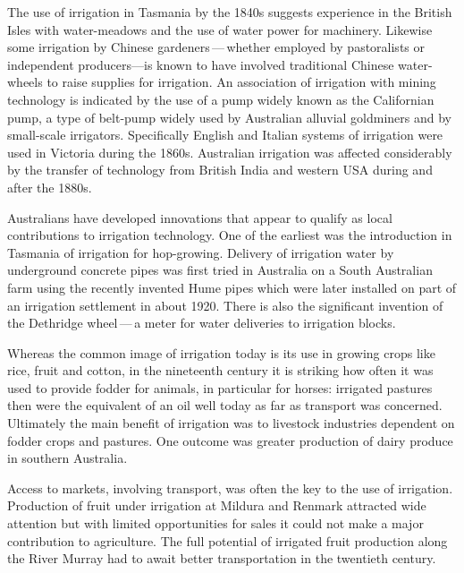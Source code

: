 The use of irrigation in Tasmania by the 1840s suggests experience in
the British Isles with water-meadows and the use of
water power for machinery.  Likewise some irrigation by Chinese
gardeners\,---\,whether employed by pastoralists or independent
producers---is known to have involved traditional
Chinese water-wheels to
raise supplies for irrigation.  An association of irrigation with
mining technology is indicated by the use of a pump widely known as
the Californian pump,  a type of
belt-pump  widely used by Australian
alluvial goldminers and by small-scale irrigators.  Specifically
English and Italian systems of
irrigation were used in Victoria during the 1860s. Australian
irrigation was affected considerably by the transfer of technology
from British India and western USA during and after the
1880s.

Australians have developed innovations that appear to qualify as local
contributions to irrigation technology.  One of the earliest was the
introduction in Tasmania of irrigation for hop-growing.  Delivery of
irrigation water by underground concrete pipes
was first tried in Australia on a South Australian farm using the
recently invented Hume pipes which were later installed on part of an
irrigation settlement in about 1920.  There is also the significant
invention of the Dethridge wheel\,---\,a
 meter for water
deliveries to irrigation blocks.

\bigskip\noindent Whereas the common image of irrigation today is its
use in growing crops like rice, fruit and cotton, in the nineteenth
century it is striking how often it was used to provide fodder for
animals, in particular for horses: irrigated
pastures then were the equivalent of an oil well today
as far as transport was concerned. Ultimately the main benefit of
irrigation was to livestock industries dependent on
fodder crops and pastures. One outcome was greater
production of dairy produce in southern Australia.

Access to markets, involving transport, was often the key to the use
of irrigation. Production of fruit under irrigation at
Mildura  and Renmark 
attracted wide attention but with limited opportunities for sales it
could not make a major contribution to agriculture. The full potential
of irrigated fruit production along the River Murray
 had to await better transportation in the
twentieth century.

